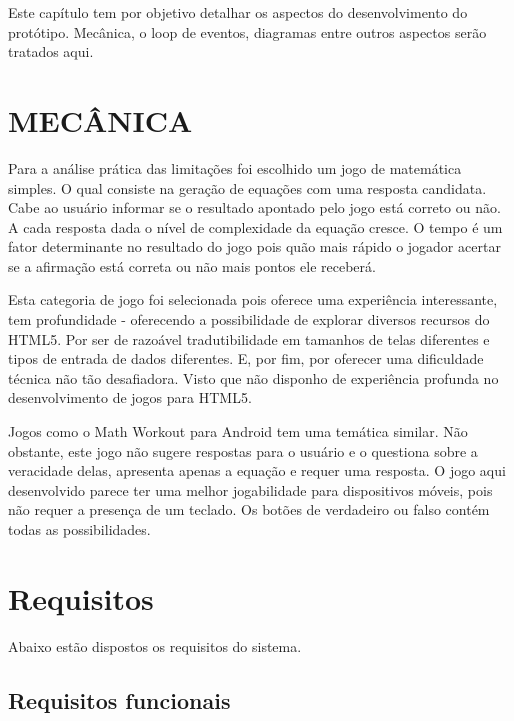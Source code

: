 Este capítulo tem por objetivo detalhar os aspectos do desenvolvimento
do protótipo. Mecânica, o loop de eventos, diagramas entre outros
aspectos serão tratados aqui.

\section{MECÂNICA}

Para a análise prática das limitações foi escolhido um jogo de
matemática simples. O qual consiste na geração de equações com uma
resposta candidata. Cabe ao usuário informar se o resultado apontado
pelo jogo está correto ou não. A cada resposta dada o nível de
complexidade da equação cresce. O tempo é um fator determinante
no resultado do jogo pois quão mais rápido o jogador acertar se a
afirmação está correta ou não mais pontos ele receberá.

Esta categoria de jogo foi selecionada pois oferece uma experiência
interessante, tem profundidade - oferecendo a possibilidade
de explorar diversos recursos do HTML5. Por ser de razoável
tradutibilidade em tamanhos de telas diferentes e tipos de entrada de
dados diferentes. E, por fim, por oferecer uma dificuldade técnica não
tão desafiadora. Visto que não disponho de experiência profunda no
desenvolvimento de jogos para HTML5.

Jogos como o Math Workout para Android tem uma temática similar.
Não obstante, este jogo não sugere respostas para o usuário
e o questiona sobre a veracidade delas, apresenta apenas a equação
e requer uma resposta. O jogo aqui desenvolvido parece ter uma melhor
jogabilidade para dispositivos móveis, pois não requer a presença
de um teclado. Os botões de verdadeiro ou falso contém todas as
possibilidades.



\section{Requisitos}

Abaixo estão dispostos os requisitos do sistema.

\subsection{Requisitos funcionais}


